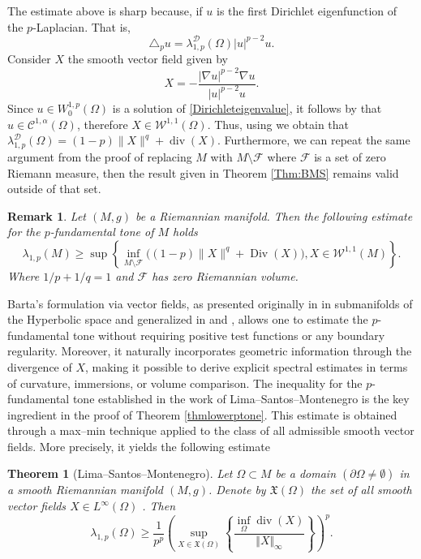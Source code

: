 \documentclass{article}
\newtheorem{theorem}{Theorem}[section]
\newtheorem{remark}[thm]{Remark}
\begin{document}
The estimate above is sharp because, if $u$ is the first Dirichlet eigenfunction of the \(p\)-Laplacian. That is,
\[ \triangle_p u = \lambda_{1,p}^{\mathcal{D}}(\Omega) |u|^{p-2}u.  \]
Consider $X$ the smooth vector field given by 
\[ X = -\frac{|\nabla u|^{p-2} \nabla u}{|u|^{p-2} u}.  \]
Since $u \in W_0^{1,p}(\Omega)$ is a solution of \eqref{Dirichleteigenvalue}, it follows by \cite[Lemma 5]{le} that $u \in \mathcal{C}^{1,\alpha}(\Omega)$, therefore $X \in \mathcal{W}^{1,1}(\Omega)$. Thus, using \cite[Remark 2.1]{LimaMontenegroSantos2010} we obtain that $\lambda_{1,p}^{\mathcal{D}}(\Omega) = (1-p)\|X\|^q+\operatorname{div}(X)$. Furthermore, we can repeat the same argument from the proof of \cite[Theorem 1.3]{LimaMontenegroSantos2010} replacing $M$ with $M \setminus \mathcal{F}$ where $\mathcal{F}$ is a set of zero Riemann measure, then the result given in Theorem \ref{Thm:BMS} remains valid outside of that set.
\begin{remark}\label{rmk:BMS}
Let $(M, g)$ be a Riemannian manifold. Then the following estimate for the $p$-fundamental tone of $M$ holds
$$
    \lambda_{1,p}(M) \geq \sup \left\{\inf_{M \setminus \mathcal{F}} \bigl( (1-p)\|X\|^q+\operatorname{Div}(X) \bigr), X \in \mathcal{W}^{1,1}(M)\right\}.
$$
Where $1 / p+1 / q=1$ and $\mathcal{F}$ has zero Riemannian volume. 
\end{remark}

Barta’s formulation via vector fields, as presented originally in \cite{cheung} in submanifolds of the  Hyperbolic space and generalized in \cite{BessaMontenegro}
and \cite{LimaMontenegroSantos2010}, allows one to estimate the $p$-fundamental tone
without requiring positive test functions or any boundary regularity.
Moreover, it naturally incorporates geometric information through the divergence of $X$, making it possible to derive explicit spectral estimates in terms of curvature,
immersions, or volume comparison. The inequality for the $p$-fundamental tone established in the work of Lima--Santos--Montenegro \cite[Theorem 1.1]{LimaMontenegroSantos2010} is the key ingredient in the proof of Theorem \ref{thmlowerptone}. This estimate is obtained through a max--min technique applied to the class of all admissible smooth vector fields. More precisely, it yields the following estimate

\begin{theorem}[Lima--Santos--Montenegro]\label{LimaSantosMontenegro}
Let $\Omega \subset M$ be a domain $(\partial \Omega \neq \emptyset)$ in a smooth Riemannian manifold $(M,g)$. Denote by $\mathfrak{X}(\Omega)$ the set of all smooth vector fields $X \in L^{\infty}(\Omega)$ .
Then
\[
 \lambda_{1,p}(\Omega) \geq \dfrac{1}{p^p} \left( \sup_{X \in \mathfrak{X}(\Omega) } \left\{ \frac{   \displaystyle \inf_{\Omega}{\operatorname{div}(X)}}{  \Vert X \Vert_{\infty}} \right\}  \right)^p. 
\]
\end{theorem}
\end{document}
